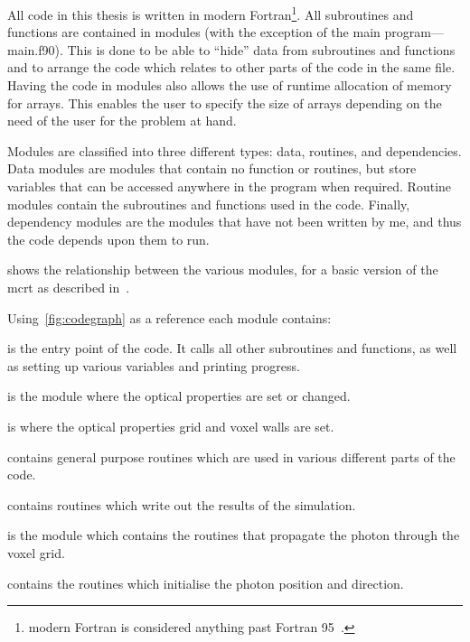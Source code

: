 All code in this thesis is written in modern Fortran\footnote{modern Fortran is considered anything past Fortran 95~\cite{metcalf2011modern}.}.
All subroutines and functions are contained in modules (with the exception of the main program---main.f90).
This is done to be able to ``hide'' data from subroutines and functions and to arrange the code which relates to other parts of the code in the same file.
Having the code in modules also allows the use of runtime allocation of memory for arrays.
This enables the user to specify the size of arrays depending on the need of the user for the problem at hand.

Modules are classified into three different types: data, routines, and dependencies.
Data modules are modules that contain no function or routines, but store variables that can be accessed anywhere in the program when required.
Routine modules contain the subroutines and functions used in the code.
Finally, dependency modules are the modules that have not been written by me, and thus the code depends upon them to run.

 shows the relationship between the various modules, for a basic version of the \gls*{mcrt} as described in~.

\medskip
\noindent Using~\cref{fig:codegraph} as a reference each module contains:

 is the entry point of the code. It calls all other subroutines and functions, as well as setting up various variables and printing progress.

 is the module where the optical properties are set or changed.

 is where the optical properties grid and voxel walls are set.

 contains general purpose routines which are used in various different parts of the code.

 contains routines which write out the results of the simulation.

 is the module which contains the routines that propagate the photon through the voxel grid.

 contains the routines which initialise the photon position and direction.

